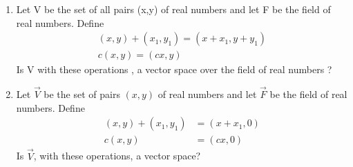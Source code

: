 \renewcommand{\theequation}{\theenumi}
\renewcommand{\thefigure}{\theenumi}
\begin{enumerate}[label=\thesubsection.\arabic*.,ref=\thesubsection.\theenumi]
%
\item Let V be the set of all pairs (x,y) of real numbers and let F be the field of real numbers. Define 
\begin{align}
(x,y)+(x_1,y_1)=(x+x_1,y+y_1)\\
c(x,y)=(cx,y)
\end{align}
Is V with these operations , a vector space over the field of real numbers ?
%
\\
\solution

%
\item Let $\vec{V}$ be the  set of pairs $(x,y)$ of real numbers and let $\vec{F}$ be the field of real numbers. Define
\begin{align}
    (x,y)+(x_1,y_1) &= (x+x_1,0) \label{eq:solutions/2/1/7/eq:eq1}\\
    c(x,y) &= (cx,0)
\end{align}
Is $\vec{V}$, with these operations, a vector space?
\\
\solution

\end{enumerate}


